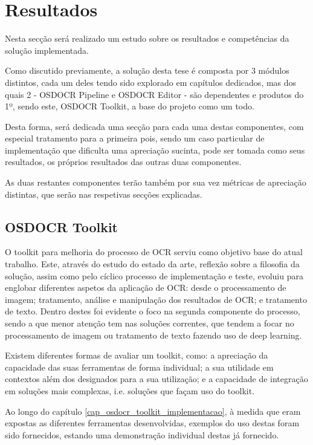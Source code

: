 \chapter{Resultados}
\label{cap_results}

Nesta secção será realizado um estudo sobre os resultados e competências da solução implementada.

Como discutido previamente, a solução desta tese é composta por 3 módulos distintos, cada um deles tendo sido explorado em capítulos dedicados, mas dos quais 2 - OSDOCR Pipeline e OSDOCR Editor - são dependentes e produtos do 1º, sendo este, OSDOCR Toolkit, a base do projeto como um todo.

Desta forma, será dedicada uma secção para cada uma destas componentes, com especial tratamento para a primeira pois, sendo um caso particular de implementação que dificulta uma apreciação sucinta, pode ser tomada como seus resultados, os próprios resultados das outras duas componentes.

As duas restantes componentes terão também por sua vez métricas de apreciação distintas, que serão nas respetivas secções explicadas.


\section{OSDOCR Toolkit}


O toolkit para melhoria do processo de OCR serviu como objetivo base do atual trabalho. Este, através do estudo do estado da arte, reflexão sobre a filosofia da solução, assim como pelo cíclico processo de implementação e teste, evoluiu para englobar diferentes aspetos da aplicação de OCR: desde o processamento de imagem; tratamento, análise e manipulação dos resultados de OCR; e tratamento de texto.
Dentro destes foi evidente o foco na segunda componente do processo, sendo a que menor atenção tem nas soluções correntes, que tendem a focar no processamento de imagem ou tratamento de texto fazendo uso de deep learning.

Existem diferentes formas de avaliar um toolkit, como: a apreciação da capacidade das suas ferramentas de forma individual; a sua utilidade em contextos além dos designados para a sua utilização; e a capacidade de integração em soluções mais complexas, i.e. soluções que façam uso do toolkit.

Ao longo do capítulo \ref{cap_osdocr_toolkit_implementacao}, à medida que eram expostas as diferentes ferramentas desenvolvidas, exemplos do uso destas foram sido fornecidos, estando uma demonstração individual destas já fornecido.

